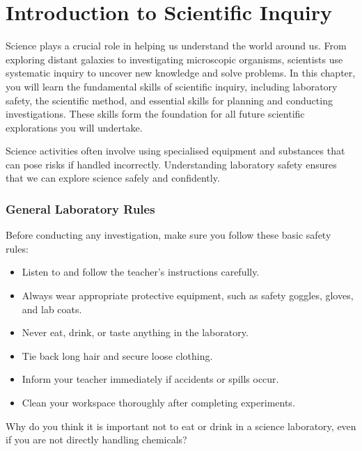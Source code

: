 \chapter{Introduction to Scientific Inquiry}

Science plays a crucial role in helping us understand the world around us. From exploring distant galaxies to investigating microscopic organisms, scientists use systematic inquiry to uncover new knowledge and solve problems. In this chapter, you will learn the fundamental skills of scientific inquiry, including laboratory safety, the scientific method, and essential skills for planning and conducting investigations. These skills form the foundation for all future scientific explorations you will undertake.

\FloatBarrier
\1

Science activities often involve using specialised equipment and substances that can pose risks if handled incorrectly. Understanding laboratory safety ensures that we can explore science safely and confidently.

\subsection{General Laboratory Rules}

Before conducting any investigation, make sure you follow these basic safety rules:

\begin{itemize}
    \item Listen to and follow the teacher's instructions carefully.
    \item Always wear appropriate protective equipment, such as safety goggles, gloves, and lab coats.
    \item Never eat, drink, or taste anything in the laboratory.
    \item Tie back long hair and secure loose clothing.
    \item Inform your teacher immediately if accidents or spills occur.
    \item Clean your workspace thoroughly after completing experiments.
\end{itemize}

\begin{stopandthink}
Why do you think it is important not to eat or drink in a science laboratory, even if you are not directly handling chemicals?
\end{stopandthink}


